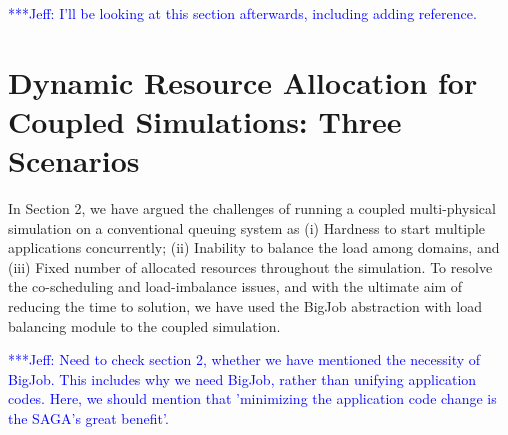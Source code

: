 \documentclass[conference,final]{IEEEtran}
\newcommand{\skonote}[1]{ {\textcolor{blue} { ***Jeff: #1 }}}
\newcommand{\skonote}[1]{}
\begin{document}


\skonote{I'll be looking at this section afterwards, including adding reference.}






\section{Dynamic Resource Allocation for Coupled Simulations: Three Scenarios }

In Section 2, we have argued the challenges of running a coupled
multi-physical simulation on a conventional queuing system as (i)
Hardness to start multiple applications concurrently; (ii) Inability
to balance the load among domains, and (iii) Fixed number of allocated
resources throughout the simulation. To resolve the co-scheduling and
load-imbalance issues, and with the ultimate aim of reducing the time
to solution, we have used the BigJob abstraction with load balancing
module to the coupled simulation.

\skonote{Need to check section 2, whether we have mentioned the necessity of BigJob. This includes why we need BigJob, rather than unifying application codes. Here, we should mention that 'minimizing the application code change is the SAGA's great benefit'.}

\end{document}
